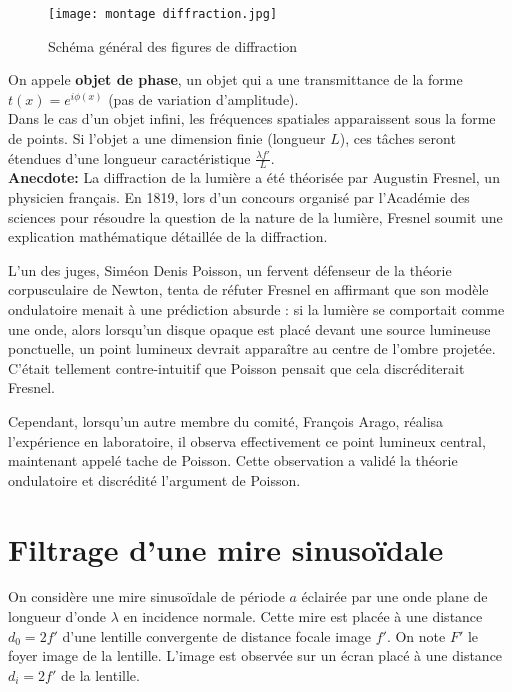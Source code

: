 \documentclass{article}
\begin{document}
\begin{figure}[h]
  \centering
  \texttt{[image: montage diffraction.jpg]}
  \caption{Schéma général des figures de diffraction}
\end{figure}

On appele \textbf{objet de phase}, un objet qui a une transmittance de la forme $t(x) = e^{i \phi(x)}$ (pas de variation d'amplitude). \\
Dans le cas d'un objet infini, les fréquences spatiales apparaissent sous la forme de points. 
Si l'objet a une dimension finie (longueur $L$), ces tâches seront étendues d'une longueur caractéristique $\frac{\lambda f'}{L}$. \\


\textbf{Anecdote:} La diffraction de la lumière a été théorisée par Augustin Fresnel, un physicien français. En 1819, lors d'un concours organisé par l'Académie des sciences pour résoudre la question de la nature de la lumière, Fresnel soumit une explication mathématique détaillée de la diffraction.

L'un des juges, Siméon Denis Poisson, un fervent défenseur de la théorie corpusculaire de Newton, tenta de réfuter Fresnel en affirmant que son modèle ondulatoire menait à une prédiction absurde : si la lumière se comportait comme une onde, alors lorsqu'un disque opaque est placé devant une source lumineuse ponctuelle, un point lumineux devrait apparaître au centre de l'ombre projetée. C'était tellement contre-intuitif que Poisson pensait que cela discréditerait Fresnel.

Cependant, lorsqu'un autre membre du comité, François Arago, réalisa l'expérience en laboratoire, il observa effectivement ce point lumineux central, maintenant appelé tache de Poisson. Cette observation a validé la théorie ondulatoire et discrédité l'argument de Poisson.
\section{Filtrage d'une mire sinusoïdale}

On considère une mire sinusoïdale de période $a$ éclairée par une onde plane de longueur d'onde $\lambda$ en incidence normale. 
Cette mire est placée à une distance $d_0 = 2 f'$ d'une lentille convergente de distance focale image $f'$.
On note $F'$ le foyer image de la lentille.
L'image est observée sur un écran placé à une distance $d_i = 2f'$ de la lentille.
\end{document}
